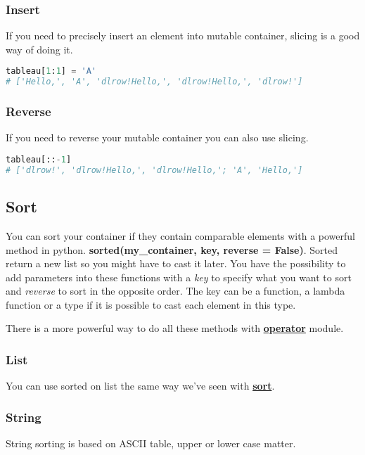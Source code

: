 \documentclass[a4paper, 12pt, titlepage]{scrartcl} %
\begin{document}
\subsubsection{Insert}  
If you need to precisely insert an element into mutable container, slicing is a good way of doing it.
\begin{lstlisting}[language=Python]
tableau[1:1] = 'A'
# ['Hello,', 'A', 'dlrow!Hello,', 'dlrow!Hello,', 'dlrow!']
\end{lstlisting} \vspace{5mm}

\subsubsection{Reverse} 
If you need to reverse your mutable container you can also use slicing.
\begin{lstlisting}[language=Python]
tableau[::-1]
# ['dlrow!', 'dlrow!Hello,', 'dlrow!Hello,'; 'A', 'Hello,']
\end{lstlisting} \vspace{5mm}

\subsection{Sort}
You can sort your container if they contain comparable elements with a powerful method in python. \textbf{sorted(my\_container, key, reverse = False)}. Sorted return a new list so you might have to cast it later. You have the possibility to add parameters into these functions with a \textit{key} to specify what you want to sort and \textit{reverse} to sort in the opposite order. The key can be a function, a lambda function or a type if it is possible to cast each element in this type.

\vspace{5mm}

There is a more powerful way to do all these methods with \hyperref[subsec:Operator]{\textbf{operator}} module.

\subsubsection{List}
You can use sorted on list the same way we've seen with \hyperref[Sort]{\textbf{sort}}.

\subsubsection{String}
String sorting is based on ASCII table, upper or lower case matter.
\end{document}
